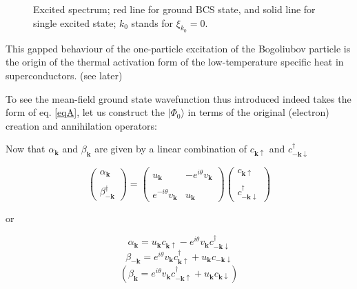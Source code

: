 \begin{figure}
\begin{center}
\end{center}
\caption{Excited spectrum; red line for ground BCS state, and solid line for single excited state; $k_0$ stands for $\xi_{k_0} = 0$. }\label{Fig6.3}
\end{figure}

This gapped behaviour of the one-particle excitation of the Bogoliubov particle is the origin of the thermal activation form of the low-temperature specific heat in superconductors. (see later)

To see the mean-field ground state wavefunction thus introduced indeed takes the form of eq. \ref{eqA}, let us construct the $|\Phi_0\rangle$ in terms of the original (electron) creation and annihilation operators: 

Now that $\alpha_{\bm{k}}$ and $\beta_{\bm{k}}$ are given by a linear combination of $c_{\bm{k}\uparrow}$ and $c_{-\bm{k}\downarrow}^\dagger$

\[
\left(\begin{matrix}
\alpha_{\bm{k}}\\
\ \\
\beta_{-\bm{k}}^\dagger
\end{matrix}\right) = \left(\begin{matrix}
u_{\bm{k}} & -e^{i\theta}v_{\bm{k}}\\
\ & \ \\
e^{-i\theta}v_{\bm{k}} & u_{\bm{k}}
\end{matrix}\right) \left(\begin{matrix}
c_{\bm{k}\uparrow}\\
\ \\
c_{-\bm{k}\downarrow}^\dagger
\end{matrix}\right) 
 \]

or

\[\alpha_{\bm{k}} = u_{\bm{k}}c_{\bm{k}\uparrow} - e^{i\theta}v_{\bm{k}}c_{-\bm{k}\downarrow}^\dagger \]
\[\beta_{-\bm{k}} = e^{i\theta}v_{\bm{k}}c_{\bm{k}\uparrow}^\dagger + u_{\bm{k}}c_{-\bm{k}\downarrow} \]
\[(\beta_{\bm{k}} = e^{i\theta}v_{\bm{k}}c_{-\bm{k}\uparrow}^\dagger+u_{\bm{k}}c_{\bm{k}\downarrow}) \]

